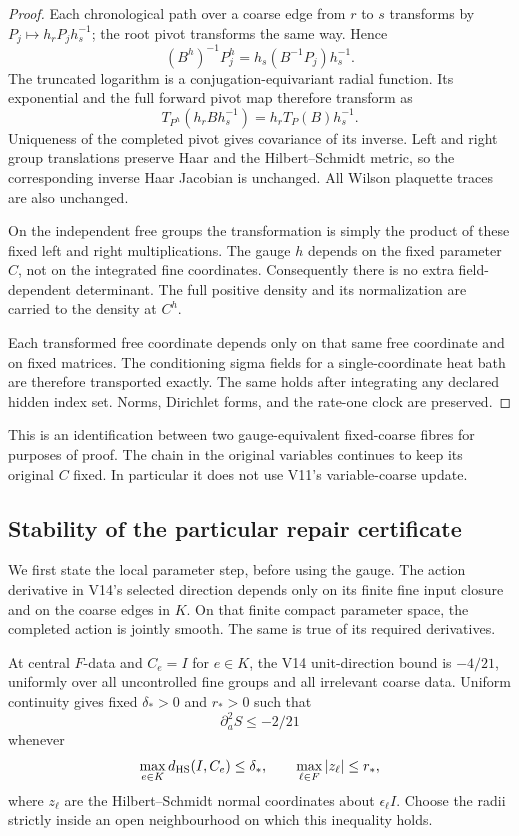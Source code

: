 \documentclass[11pt,oneside]{article}
\begin{document}
\begin{proof}
Each chronological path over a
coarse edge from \(r\) to \(s\)
transforms by \(P_j\mapsto
h_rP_jh_s^{-1}\); the root pivot
transforms the same way. Hence
\[
 (B^h)^{-1}P_j^h
                 =h_s(B^{-1}P_j)h_s^{-1}.
\]
The truncated logarithm is a
conjugation-equivariant radial
function. Its exponential and
the full forward pivot map
therefore transform as
\[
 T_{P^h}(h_rBh_s^{-1})
                        =h_rT_P(B)h_s^{-1}.
\]
Uniqueness of the completed
pivot gives covariance of its
inverse. Left and right group
translations preserve Haar and
the Hilbert--Schmidt metric, so
the corresponding inverse Haar
Jacobian is unchanged. All
Wilson plaquette traces are
also unchanged.

On the independent free groups
the transformation is simply
the product of these fixed left
and right multiplications.
The gauge \(h\) depends on the
fixed parameter \(C\), not on
the integrated fine coordinates.
Consequently there is no extra
field-dependent determinant.
The full positive density and
its normalization are carried
to the density at \(C^h\).

Each transformed free coordinate
depends only on that same free
coordinate and on fixed matrices.
The conditioning sigma fields
for a single-coordinate heat
bath are therefore transported
exactly. The same holds after
integrating any declared hidden
index set. Norms, Dirichlet forms,
and the rate-one clock are
preserved.
\end{proof}

This is an identification between
two gauge-equivalent fixed-coarse
fibres for purposes of proof.
The chain in the original
variables continues to keep its
original \(C\) fixed. In
particular it does not use
V11's variable-coarse update.

\subsection{Stability of the particular repair certificate}

We first state the local parameter
step, before using the gauge.
The action derivative in V14's
selected direction depends only
on its finite fine input closure
and on the coarse edges in \(K\).
On that finite compact parameter
space, the completed action is
jointly smooth. The same is true
of its required derivatives.

At central \(F\)-data and
\(C_e=I\) for \(e\in K\), the
V14 unit-direction bound is
\(-4/21\), uniformly over all
uncontrolled fine groups and
all irrelevant coarse data.
Uniform continuity gives fixed
\(\delta_*>0\) and \(r_*>0\)
such that
\begin{equation}\label{eq:f13v15-open}
 \partial_a^2S\le-2/21
\end{equation}
whenever
\[
 \max_{e\in K}d_{\rm HS}(I,C_e)\le\delta_*,
 \qquad
 \max_{\ell\in F}|z_\ell|\le r_*,
\]
where \(z_\ell\) are the
Hilbert--Schmidt normal
coordinates about
\(\epsilon_\ell I\). Choose
the radii strictly inside an
open neighbourhood on which
this inequality holds.
\end{document}
